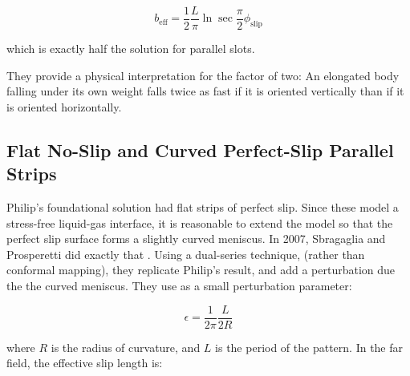 \documentclass[a4paper]{report}
\newcommand{\beff}{\ensuremath{b_{\mathrm{eff}}}}
\newcommand{\phislip}{\ensuremath{\phi_{\mathrm{slip}}}}
\begin{document}
\[ \beff= \frac{1}{2} \frac{L}{\pi}	\ln \sec \frac{\pi}{2} \phislip \]

which is exactly half the solution for parallel slots.

They provide a physical interpretation for the factor of two: An elongated body falling under its own weight falls twice as fast if it is oriented vertically than if it is oriented horizontally.

\begin{center}
\end{center}


\subsection*{Flat No-Slip and Curved Perfect-Slip Parallel Strips}

Philip's foundational solution had flat strips of perfect slip.  Since these model a stress-free liquid-gas interface, it is reasonable to extend the model so that the perfect slip surface forms a slightly curved meniscus.  In 2007, Sbragaglia and Prosperetti did exactly that \cite{SbragagliaProsperetti2007}.  Using a dual-series technique, (rather than conformal mapping), they replicate Philip's result, and add a perturbation due the the curved meniscus.  They use as a small perturbation parameter:

\[ \epsilon = \frac{1}{2\pi} \frac{L}{2R} \]

where $R$ is the radius of curvature, and $L$ is the period of the pattern.  In the far field, the effective slip length is:
\end{document}
